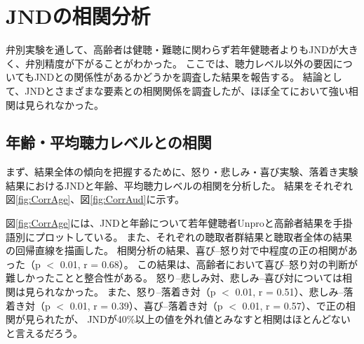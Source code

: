 \chapter{JNDの相関分析}
\label{sec:CorrJND}
弁別実験を通して、高齢者は健聴・難聴に関わらず若年健聴者よりもJNDが大きく、弁別精度が下がることがわかった。
ここでは、聴力レベル以外の要因についてもJNDとの関係性があるかどうかを調査した結果を報告する。
結論として、JNDとさまざまな要素との相関関係を調査したが、ほぼ全てにおいて強い相関は見られなかった。



\section{年齢・平均聴力レベルとの相関}
まず、結果全体の傾向を把握するために、怒り・悲しみ・喜び実験、落着き実験結果におけるJNDと年齢、平均聴力レベルの相関を分析した。
結果をそれぞれ図\ref{fig:CorrAge}、図\ref{fig:CorrAud}に示す。 

図\ref{fig:CorrAge}には、JNDと年齢について若年健聴者Unproと高齢者結果を手掛語別にプロットしている。
また、それぞれの聴取者群結果と聴取者全体の結果の回帰直線を描画した。
相関分析の結果、喜び--怒り対で中程度の正の相関があった（p $<$ 0.01, r = 0.68）。
この結果は、高齢者において喜び--怒り対の判断が難しかったことと整合性がある。
怒り--悲しみ対、悲しみ--喜び対については相関は見られなかった。
また、怒り--落着き対（p $<$ 0.01, r = 0.51）、悲しみ--落着き対（p $<$ 0.01, r = 0.39）、喜び--落着き対（p $<$ 0.01, r = 0.57）、で正の相関が見られたが、
JNDが40\%以上の値を外れ値とみなすと相関はほとんどないと言えるだろう。



